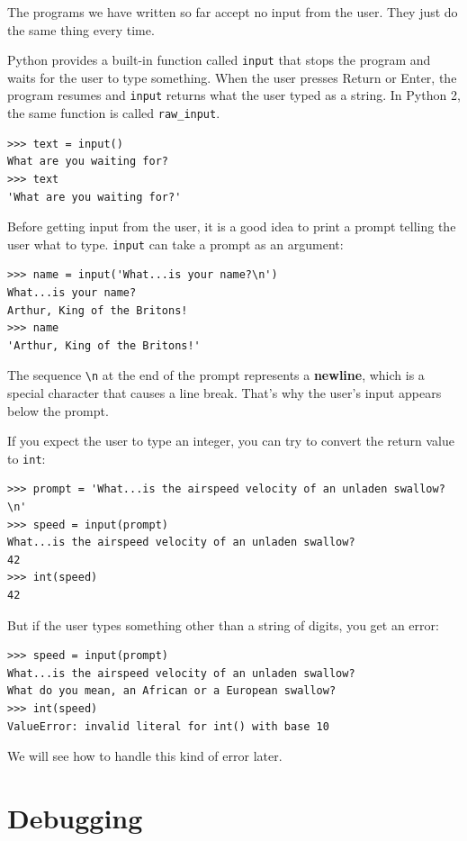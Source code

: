 \documentclass[10pt]{book}
\begin{document}
The programs we have written so far accept no input from the user.
They just do the same thing every time.

Python provides a built-in function called {\tt input} that
stops the program and
waits for the user to type something.  When the user presses {\sf
  Return} or {\sf Enter}, the program resumes and \verb"input"
returns what the user typed as a string.  In Python 2, the same
function is called \verb"raw_input".

\begin{verbatim}
>>> text = input()
What are you waiting for?
>>> text
'What are you waiting for?'
\end{verbatim}
%
Before getting input from the user, it is a good idea to print a
prompt telling the user what to type.  \verb"input" can take a
prompt as an argument:

\begin{verbatim}
>>> name = input('What...is your name?\n')
What...is your name?
Arthur, King of the Britons!
>>> name
'Arthur, King of the Britons!'
\end{verbatim}
%
The sequence \verb"\n" at the end of the prompt represents a {\bf
  newline}, which is a special character that causes a line break.
That's why the user's input appears below the prompt.  

If you expect the user to type an integer, you can try to convert
the return value to {\tt int}:

\begin{verbatim}
>>> prompt = 'What...is the airspeed velocity of an unladen swallow?\n'
>>> speed = input(prompt)
What...is the airspeed velocity of an unladen swallow?
42
>>> int(speed)
42
\end{verbatim}
%
But if the user types something other than a string of digits,
you get an error:

\begin{verbatim}
>>> speed = input(prompt)
What...is the airspeed velocity of an unladen swallow?
What do you mean, an African or a European swallow?
>>> int(speed)
ValueError: invalid literal for int() with base 10
\end{verbatim}
%
We will see how to handle this kind of error later.


\section{Debugging}
\label{whitespace}
\end{document}
